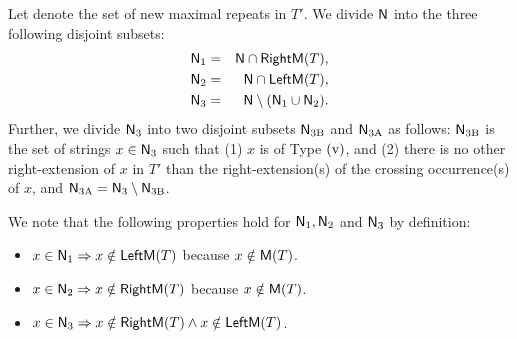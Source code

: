 \begin{definition} \label{def:new_maximal_repeats}
  Let
  denote the set of new maximal repeats in $T'$.
  We divide $\mathsf{N}$ into the three following disjoint subsets:
    \begin{eqnarray*}
    \mathsf{N}_{\mathrm{1}} & = & \mathsf{N}\cap \mathsf{RightM}(T), \\
    \mathsf{N}_{\mathrm{2}} & = & \mathsf{N}\cap \mathsf{LeftM}(T), \\
    \mathsf{N}_{\mathrm{3}} & = & \mathsf{N} \setminus (\mathsf{N}_{\mathrm{1}} \cup \mathsf{N}_{\mathrm{2}}).
    \end{eqnarray*}
  Further, we divide $\mathsf{N}_{\mathrm{3}}$ into two disjoint subsets $\mathsf{N}_{\mathrm{3B}}$ and $\mathsf{N}_{\mathrm{3A}}$ as follows:
  $\mathsf{N}_{\mathrm{3B}}$ is the set of strings $x \in \mathsf{N}_{\mathrm{3}}$ such that
  (1) $x$ is of Type $\rm{(v)}$, and
  (2) there is no other right-extension of $x$ in $T'$ than the right-extension(s) of the crossing occurrence(s) of $x$,
  and $\mathsf{N}_{\mathrm{3A}} = \mathsf{N}_{\mathrm{3}} \setminus \mathsf{N}_{\mathrm{3B}}$.


%
\end{definition}

We note that the following properties hold for $\mathsf{N}_{\mathrm{1}},\mathsf{N}_{\mathrm{2}}$ and $\mathsf{N}_{\mathrm{3}}$ by definition:
\begin{itemize}
\item $x\in \mathsf{N}_{\mathrm{1}}\Rightarrow x\notin \mathsf{LeftM}(T)$ because $x \notin \mathsf{M}(T)$.
\item $x\in \mathsf{N}_{\mathrm{2}}\Rightarrow x\notin \mathsf{RightM}(T)$ because $x \notin \mathsf{M}(T)$.
\item $x\in \mathsf{N}_{\mathrm{3}}\Rightarrow x\notin \mathsf{RightM}(T) \land x\notin \mathsf{LeftM}(T)$.
\end{itemize}

